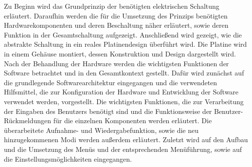 Zu Beginn wird das Grundprinzip der benötigten elektrischen Schaltung erläutert. Daraufhin werden die für die Umsetzung des Prinzips benötigten Hardwarekomponenten und deren Beschaltung näher erläutert, sowie deren Funktion in der Gesamtschaltung aufgezeigt. Anschließend wird gezeigt, wie die abstrakte Schaltung in ein reales Platinendesign überführt wird. Die Platine wird in einem Gehäuse montiert, dessen Konstruktion und Design dargestellt wird. Nach der Behandlung der Hardware werden die wichtigsten Funktionen der Software betrachtet und in den Gesamtkontext gestellt. Dafür wird zunächst auf die grundlegende Softwarearchitektur eingegangen und die verwendeten Hilfsmittel, die zur Konfiguration der Hardware und Entwicklung der Software verwendet werden, vorgestellt. Die wichtigsten Funktionen, die zur Verarbeitung der Eingaben des Benutzers benötigt sind und die Funktionsweise der Benutzer-Rückmeldungen für die einzelnen Komponenten werden erläutert. Die überarbeitete Aufnahme- und Wiedergabefunktion, sowie die neu hinzugekommenen Modi werden außerdem erläutert. Zuletzt wird auf den Aufbau und die Umsetzung des Menüs und der entsprechenden Menüführung, sowie auf die Einstellungsmöglichkeiten eingegangen.
